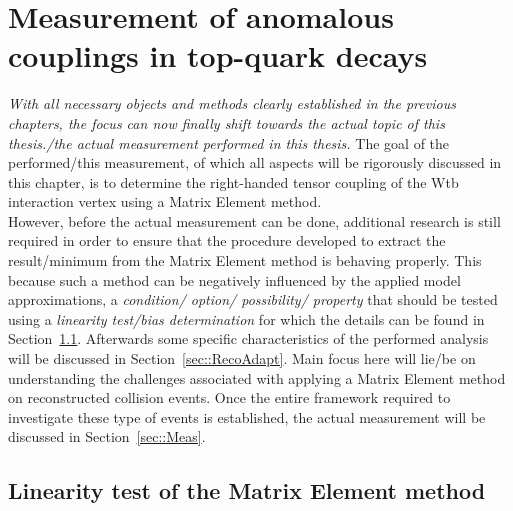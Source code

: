 \chapter{Measurement of anomalous couplings in top-quark decays} \label{ch::Analysis}

\textit{With all necessary objects and methods clearly established in the previous chapters, the focus can now finally shift towards the actual topic of this thesis./the actual measurement performed in this thesis.}
The goal of the performed/this measurement, of which all aspects will be rigorously discussed in this chapter, is to determine the right-handed tensor coupling of the Wtb interaction vertex using a Matrix Element method.
\\

However, before the actual measurement can be done, additional research is still required in order to ensure that the procedure developed to extract the result/minimum from the Matrix Element method is behaving properly. This because such a method can be negatively influenced by the applied model approximations, a \textit{condition/ option/ possibility/ property} that should be tested using a \textit{linearity test/bias determination} for which the details can be found in Section~\ref{sec::CalibCurve}.
Afterwards some specific characteristics of the performed analysis will be discussed in Section~\ref{sec::RecoAdapt}.
Main focus here will lie/be on understanding the challenges associated with applying a Matrix Element method on reconstructed collision events.
Once the entire framework required to investigate these type of events is established, the actual measurement will be discussed in Section~\ref{sec::Meas}. 

\section{Linearity test of the Matrix Element method} \label{sec::CalibCurve}

